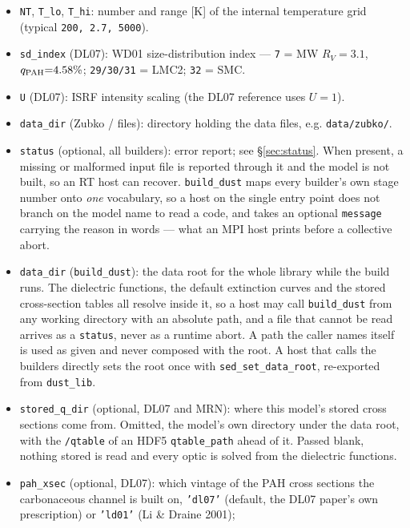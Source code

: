 \documentclass{my_memo}
\newcommand{\code}[1]{\texttt{#1}}
\begin{document}
\begin{itemize}
\item \code{NT}, \code{T\_lo}, \code{T\_hi}: number and range [K] of the internal
      temperature grid (typical \code{200, 2.7, 5000}).
\item \code{sd\_index} (DL07): WD01 size-distribution index --- \code{7} =
      MW $R_V{=}3.1$, $q_{\rm PAH}{=}4.58\%$; \code{29/30/31} = LMC2; \code{32} = SMC.
\item \code{U} (DL07): ISRF intensity scaling (the DL07 reference uses $U{=}1$).
\item \code{data\_dir} (Zubko / files): directory holding the data files, e.g.
      \code{data/zubko/}.
\item \code{status} (optional, all builders): error report; see
      \S\ref{sec:status}. When present, a missing or malformed input file is
      reported through it and the model is not built, so an RT host can recover.
      \code{build\_dust} maps every builder's own stage number onto \emph{one}
      vocabulary, so a host on the single entry point does not branch on the
      model name to read a code, and takes an optional \code{message} carrying
      the reason in words --- what an MPI host prints before a collective abort.
\item \code{data\_dir} (\code{build\_dust}): the data root for the whole library
      while the build runs. The dielectric functions, the default extinction
      curves and the stored cross-section tables all resolve inside it, so a
      host may call \code{build\_dust} from any working directory with an
      absolute path, and a file that cannot be read arrives as a \code{status},
      never as a runtime abort. A path the caller names itself is used as given
      and never composed with the root. A host that calls the builders
      directly sets the root once with \code{sed\_set\_data\_root}, re-exported
      from \code{dust\_lib}.
\item \code{stored\_q\_dir} (optional, DL07 and MRN): where this model's stored cross
      sections come from. Omitted, the model's own directory under the data
      root, with the \code{/qtable} of an HDF5 \code{qtable\_path} ahead of it.
      Passed blank, nothing stored is read and every optic is solved from the
      dielectric functions.
\item \code{pah\_xsec} (optional, DL07): which vintage of the PAH cross
      sections the carbonaceous channel is built on, \code{'dl07'} (default,
      the DL07 paper's own prescription) or \code{'ld01'} (Li \& Draine 2001);

\end{itemize}
\end{document}
